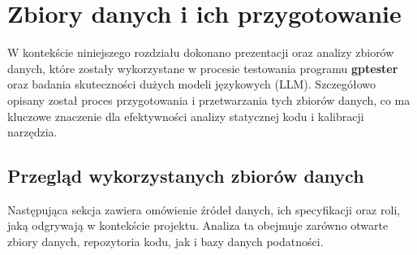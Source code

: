 \chapter{Zbiory danych i ich przygotowanie}
\label{ch:zbiory_danych}

W kontekście niniejszego rozdziału dokonano prezentacji oraz analizy zbiorów danych, które zostały wykorzystane w procesie testowania programu \textbf{gptester} oraz badania skuteczności dużych modeli językowych (LLM). Szczegółowo opisany został proces przygotowania i przetwarzania tych zbiorów danych, co ma kluczowe znaczenie dla efektywności analizy statycznej kodu i kalibracji narzędzia.


\section{Przegląd wykorzystanych zbiorów danych}
\label{sec:przeglad_zbiorow}

Następująca sekcja zawiera omówienie źródeł danych, ich specyfikacji oraz roli, jaką odgrywają w kontekście projektu. Analiza ta obejmuje zarówno otwarte zbiory danych, repozytoria kodu, jak i bazy danych podatności.


